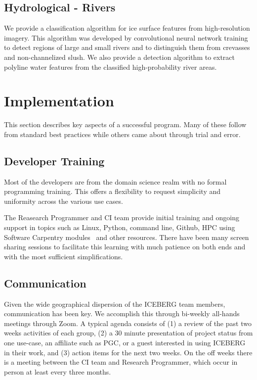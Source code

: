 \documentclass[manuscript,screen]{acmart}
\begin{document}
\subsection{Hydrological - Rivers}
We provide a classification algorithm for ice surface features from high-resolution imagery. This algorithm was developed by convolutional neural network training to detect regions of large and small rivers and to distinguish them from crevasses and non-channelized slush. We also provide a detection algorithm to extract polyline water features from the classified high-probability river areas. 

\section{Implementation}
This section describes key aspects of a successful program.  Many of these 
follow from standard best practices while others came about through trial and error.


\subsection{Developer Training}
Most of the developers are from the domain science realm with no formal programming training.  This offers a flexibility to request simplicity and uniformity across the various use cases.

The Reasearch Programmer and CI team provide initial training and ongoing support in topics such as Linux, Python, command line, Github, HPC using 
Software Carpentry modules~\cite{SWweb:20} and other resources.  There have
been many screen sharing sessions to facilitate this learning with 
much patience on both ends and with the most sufficient simplifications.

\subsection{Communication}
Given the wide geographical dispersion of the ICEBERG team members, communication has been key.  We accomplish this through bi-weekly all-hands meetings through Zoom. A typical agenda consists of (1) a review of the past two weeks activities of each group, (2) a 30 minute presentation of project status from one use-case, an affiliate such as PGC, or a guest interested in using ICEBERG in their work, and (3) action items for the next two weeks.  On the off weeks there is a meeting between the CI team and Research Programmer, which occur in person at least every three months.
\end{document}
